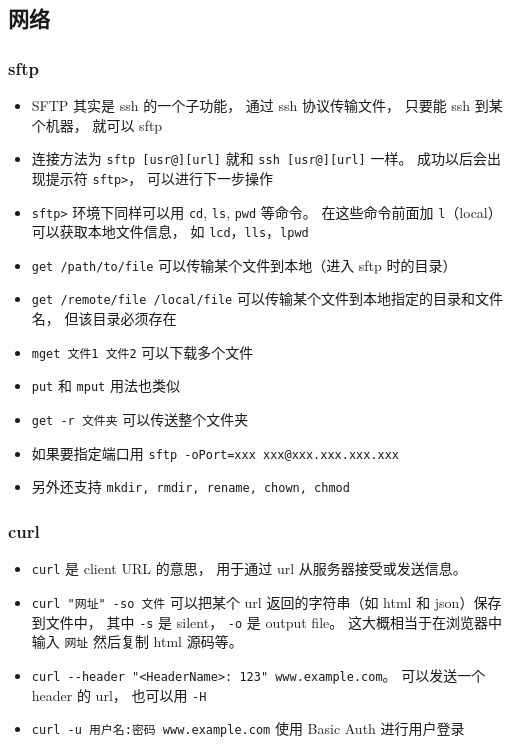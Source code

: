 \subsection{网络}
\subsubsection{sftp}
\begin{itemize}
\item SFTP 其实是 ssh 的一个子功能， 通过 ssh 协议传输文件， 只要能 ssh 到某个机器， 就可以 sftp
\item 连接方法为 \verb`sftp [usr@][url]` 就和 \verb`ssh [usr@][url]` 一样。 成功以后会出现提示符 \verb`sftp>`， 可以进行下一步操作
\item \verb`sftp>` 环境下同样可以用 \verb`cd`, \verb`ls`, \verb`pwd` 等命令。 在这些命令前面加 \verb`l`（local）可以获取本地文件信息， 如 \verb`lcd`，\verb`lls`，\verb`lpwd`
\item \verb`get /path/to/file` 可以传输某个文件到本地（进入 sftp 时的目录）
\item \verb`get /remote/file /local/file` 可以传输某个文件到本地指定的目录和文件名， 但该目录必须存在
\item \verb`mget 文件1 文件2` 可以下载多个文件
\item \verb`put` 和 \verb`mput` 用法也类似
\item \verb`get -r 文件夹` 可以传送整个文件夹
\item 如果要指定端口用 \verb`sftp -oPort=xxx xxx@xxx.xxx.xxx.xxx`
\item 另外还支持 \verb`mkdir, rmdir, rename, chown, chmod`
\end{itemize}

\subsubsection{curl}
\begin{itemize}
\item \verb`curl` 是 client URL 的意思， 用于通过 url 从服务器接受或发送信息。
\item \verb`curl "网址" -so 文件` 可以把某个 url 返回的字符串（如 html 和 json）保存到文件中， 其中 \verb`-s` 是 silent， \verb`-o` 是 output file。 这大概相当于在浏览器中输入 \verb`网址` 然后复制 html 源码等。
\item \verb`curl --header "<HeaderName>: 123" www.example.com`。 可以发送一个 header 的 url， 也可以用 \verb`-H`
\item \verb`curl -u 用户名:密码 www.example.com` 使用 Basic Auth 进行用户登录
\end{itemize}

